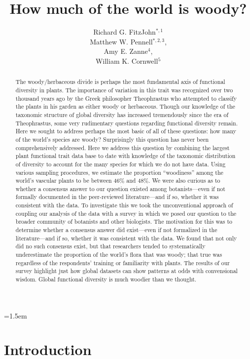 \documentclass[12pt]{article}
\title{How much of the world is woody?}
\author{
Richard G. FitzJohn$^{*,1}$\\ Matthew W. Pennell$^{*,2,3}$,\\ Amy E. Zanne$^{4}$,\\ William K. Cornwell$^{5}$
}
\date{}
\affiliation{\noindent
$^*$ These authors contributed equally}
\begin{document}
\mstitlepage
\parindent=1.5em
\addtolength{\parskip}{.3em}

\begin{abstract}
The woody/herbaceous divide is perhaps the most fundamental axis of functional diversity in plants. The importance of variation in this trait was recognized over two thousand years ago by the Greek philosopher Theophrastus who attempted to classify the plants in his garden as either woody or herbaceous. Though our knowledge of the taxonomic structure of global diversity has increased tremendously since the era of Theophrastus, some very rudimentary questions regarding functional diversity remain. Here we sought to address perhaps the most basic of all of these questions: how many of the world's species are woody? Surprisingly this question has never been comprehensively addressed. Here we address this question by combining the largest plant functional trait data base to date with knowledge of the taxonomic distribution of diversity to account for the many species for which we do not have data. Using various sampling procedures, we estimate the proportion ``woodiness'' among the world's vascular plants to be between 46\% and 48\%. We were also curious as to whether a consensus answer to our question existed among botanists---even if not formally documented in the peer-reviewed literature---and if so, whether it was consistent with the data. To investigate this we took the unconventional approach of coupling our analysis of the data with a survey in which we posed our question to the broader community of botanists and other biologists. The motivation for this was to determine whether a consensus answer did exist---even if not formalized in the literature---and if so, whether it was consistent with the data. We found that not only did no such consensus exist, but that researchers tended to systematically underestimate the proportion of the world's flora that was woody; that true was regardless of the respondents' training or familiarity with plants. The results of our survey highlight just how global datasets can show patterns at odds with convensional wisdom.  Global functional diversity is much woodier than we thought.  
\end{abstract}

\section{Introduction}
\end{document}
